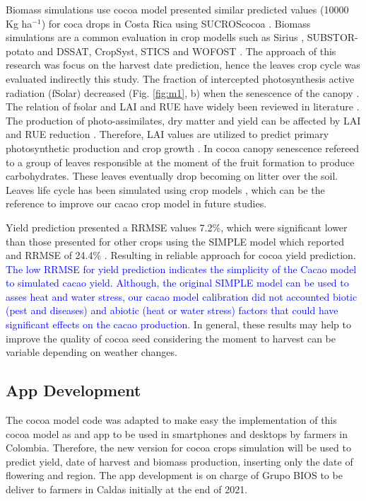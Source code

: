 \documentclass[gene,journal,article,submit,moreauthors,pdftex]{Definitions/mdpi}
\begin{document}
 
Biomass simulations use cocoa model presented similar predicted values (10000 Kg ha$^{-1}$) for coca drops in Costa Rica using SUCROScocoa \citep{zuidema2005}. Biomass simulations are a common evaluation in crop modells such as Sirius \citep{Crout20142}, SUBSTOR-potato \citep{Raymundo2017} and  DSSAT, CropSyst, STICS and WOFOST \citep{Confalonieri2016}. The approach of this research was focus  on the harvest date prediction, hence the leaves crop cycle was evaluated indirectly this study. The fraction of intercepted photosynthesis active radiation (fSolar) decreased (Fig. \ref{fig:m1}, b) when the senescence of the canopy \citep{zuidema2005}. The relation of fsolar and LAI \citep{lahive2019, Danner2015, Soltani2012, Romero2017, Vina2011, Baracaldo2014} and RUE \citep{Fletcher2013RUE,Bonhomme2000} have widely been reviewed in literature . The  production of photo-assimilates, dry matter and yield can be affected by LAI and RUE reduction \citep{Deblonde2001, Fletcher2013RUE,Bonhomme2000, Romero2017}. Therefore, LAI values are utilized to predict primary photosynthetic production and crop growth \cite{Romero2017, Soltani2012, zuidema2005,Baracaldo2014}. In cocoa canopy senescence  refereed to  a group of leaves responsible  at the moment of the fruit formation to produce carbohydrates. These leaves eventually drop becoming on litter over the soil. Leaves life cycle has been simulated using crop models \citep{Crout2010, zuidema2005}, which can be the reference to improve our cacao crop model in future studies.   

Yield prediction presented a RRMSE values 7.2\%, which were significant lower than those  presented for other crops using the SIMPLE model which reported and RRMSE of 24.4\% \citep{Zao2019simple}. Resulting in reliable approach for cocoa yield prediction.  \textcolor{blue}{The low RRMSE for yield prediction indicates the simplicity of the Cacao model to simulated cacao  yield. Although, the original SIMPLE model can be used to asses heat and water stress, our cacao model calibration  did  not accounted biotic (pest and diseases) and abiotic (heat or water stress) factors that could have significant effects on the cacao production.} In general, these results may help to improve the quality of cocoa seed considering the moment to harvest can be variable depending on weather changes. 


\subsection{App Development}
The cocoa model code was adapted to make easy the implementation of this cocoa model as and app to be used in smartphones and desktops by farmers in Colombia. Therefore, the new version for cocoa crops simulation will be used to predict yield, date of harvest and biomass production, inserting only the date of flowering and region. The app development is on charge of Grupo BIOS to be deliver to farmers in Caldas initially at the end of 2021. 
\end{document}
